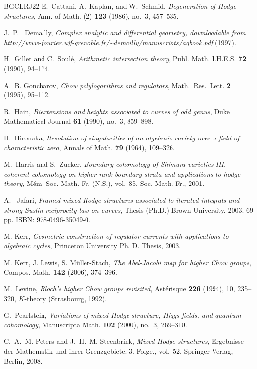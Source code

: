 \documentclass[11pt,a4paper]{amsart}
\numberwithin{equation}{section}
\theoremstyle{plain}
\theoremstyle{definition}
\begin{document}
\begin{thebibliography}{BGCLRJ22}
E.~Cattani, A.~Kaplan, and W.~Schmid, \emph{Degeneration of {H}odge
  structures}, Ann. of Math. (2) \textbf{123} (1986), no.~3, 457--535.
  
	J.~P.~ Demailly, \emph{Complex analytic and differential geometry, downloadable from \url{http://www-fourier.ujf-grenoble.fr/~demailly/manuscripts/agbook.pdf}} (1997).
	
	
H.~Gillet and C.~Soul{\'e}, \emph{Arithmetic intersection theory}, Publ. Math.
  I.H.E.S. \textbf{72} (1990), 94--174.

 
A.~B. Goncharov, \emph{Chow polylogarithms and regulators}, Math.~Res.~Lett.
  \textbf{2} (1995), 95--112.
  
R.~Hain, \emph{Biextensions and heights associated to curves of odd genus},
  Duke Mathematical Journal \textbf{61} (1990), no.~3, 859--898.

H.~Hironaka, \emph{Resolution of singularities of an algebraic variety over a
  field of characteristic zero}, Annals of Math. \textbf{79} (1964), 109--326.

M.~Harris and S.~Zucker, \emph{Boundary cohomology of {S}himura varieties
  {III}. coherent cohomology on higher-rank boundary strata and applications to
  hodge theory}, M\'em. Soc. Math. Fr. (N.S.), vol.~85, Soc. Math. Fr., 2001.
  
A.~ Jafari, \emph{Framed mixed Hodge structures associated to iterated
  integrals and strong Suslin reciprocity law on curves}, Thesis
(Ph.D.) Brown University. 2003. 69 pp. ISBN: 978-0496-35049-0.

 M. Kerr, \emph{Geometric construction of regulator currents with applications to algebraic cycles}, Princeton University Ph. D. Thesis, 2003.

   M. Kerr, J. Lewis, S. M\"uller-Stach, \emph{The
    {A}bel-{J}acobi map for higher {C}how groups},
  Compos. Math. \textbf{142} (2006), 374--396.

M.~Levine, \emph{Bloch's higher {C}how groups revisited}, Ast\'erisque
  \textbf{226} (1994), 10, 235--320, $K$-theory (Strasbourg, 1992).

G.~Pearlstein, \emph{Variations of mixed {H}odge structure, {H}iggs fields, and
  quantum cohomology}, Manuscripta Math. \textbf{102} (2000), no.~3, 269--310.

C.~A.~M. Peters and J.~H.~M. Steenbrink, \emph{Mixed Hodge structures},
  Ergebnisse der Mathematik und ihrer Grenzgebiete. 3. Folge., vol.~52,
  Springer-Verlag, Berlin, 2008.

\end{thebibliography}
\end{document}
